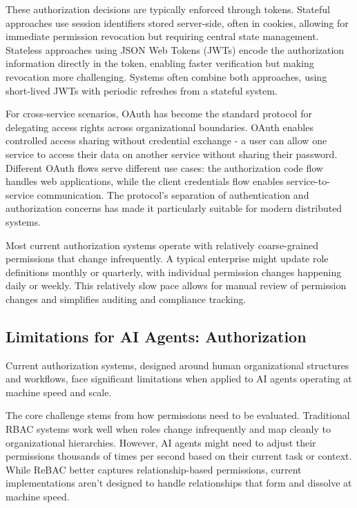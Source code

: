 \documentclass{article}
\begin{document}
These authorization decisions are typically enforced through tokens. Stateful approaches use session identifiers stored server-side, often in cookies, allowing for immediate permission revocation but requiring central state management. Stateless approaches using JSON Web Tokens (JWTs) encode the authorization information directly in the token, enabling faster verification but making revocation more challenging. Systems often combine both approaches, using short-lived JWTs with periodic refreshes from a stateful system.

For cross-service scenarios, OAuth has become the standard protocol for delegating access rights across organizational boundaries. OAuth enables controlled access sharing without credential exchange - a user can allow one service to access their data on another service without sharing their password. Different OAuth flows serve different use cases: the authorization code flow handles web applications, while the client credentials flow enables service-to-service communication. The protocol's separation of authentication and authorization concerns has made it particularly suitable for modern distributed systems.

Most current authorization systems operate with relatively coarse-grained permissions that change infrequently. A typical enterprise might update role definitions monthly or quarterly, with individual permission changes happening daily or weekly. This relatively slow pace allows for manual review of permission changes and simplifies auditing and compliance tracking.


\subsection{Limitations for AI Agents: Authorization}
\label{subsec:authorization_limitations}
Current authorization systems, designed around human organizational structures and workflows, face significant limitations when applied to AI agents operating at machine speed and scale.

The core challenge stems from how permissions need to be evaluated. Traditional RBAC systems work well when roles change infrequently and map cleanly to organizational hierarchies. However, AI agents might need to adjust their permissions thousands of times per second based on their current task or context. While ReBAC better captures relationship-based permissions, current implementations aren't designed to handle relationships that form and dissolve at machine speed.
\end{document}
